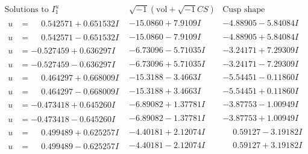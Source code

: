 \documentclass[1p]{elsarticle_modified}
\theoremstyle{definition}
\newcommand{\I}{\sqrt{-1}}
\begin{document}
$$\begin{array}{c|c|c}  
\text{Solutions to }I^u_{1}& \I (\text{vol} + \sqrt{-1}CS) & \text{Cusp shape}\\
 \hline 
\begin{aligned}
u &= \phantom{-}0.542571 + 0.651532 I\end{aligned}
 & -15.0860 + 7.9109 I & -4.88905 - 5.84084 I \\ \hline\begin{aligned}
u &= \phantom{-}0.542571 - 0.651532 I\end{aligned}
 & -15.0860 - 7.9109 I & -4.88905 + 5.84084 I \\ \hline\begin{aligned}
u &= -0.527459 + 0.636297 I\end{aligned}
 & -6.73096 - 5.71035 I & -3.24171 + 7.29309 I \\ \hline\begin{aligned}
u &= -0.527459 - 0.636297 I\end{aligned}
 & -6.73096 + 5.71035 I & -3.24171 - 7.29309 I \\ \hline\begin{aligned}
u &= \phantom{-}0.464297 + 0.668009 I\end{aligned}
 & -15.3188 - 3.4663 I & -5.54451 - 0.11860 I \\ \hline\begin{aligned}
u &= \phantom{-}0.464297 - 0.668009 I\end{aligned}
 & -15.3188 + 3.4663 I & -5.54451 + 0.11860 I \\ \hline\begin{aligned}
u &= -0.473418 + 0.645260 I\end{aligned}
 & -6.89082 + 1.37781 I & -3.87753 - 1.00949 I \\ \hline\begin{aligned}
u &= -0.473418 - 0.645260 I\end{aligned}
 & -6.89082 - 1.37781 I & -3.87753 + 1.00949 I \\ \hline\begin{aligned}
u &= \phantom{-}0.499489 + 0.625257 I\end{aligned}
 & -4.40181 + 2.12074 I & \phantom{-}0.59127 - 3.19182 I \\ \hline\begin{aligned}
u &= \phantom{-}0.499489 - 0.625257 I\end{aligned}
 & -4.40181 - 2.12074 I & \phantom{-}0.59127 + 3.19182 I \\ \hline\begin{aligned}

\end{aligned}
\end{array}$$
\end{document}
